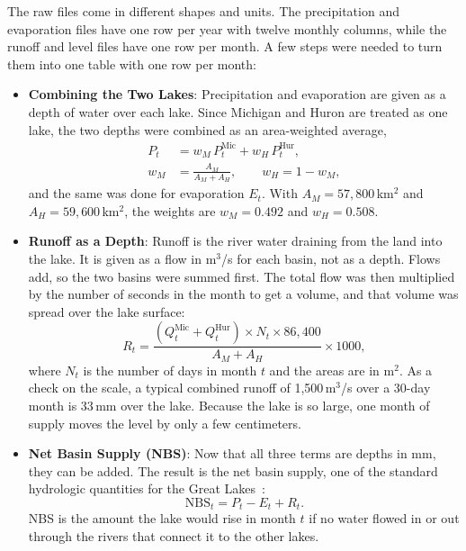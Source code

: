 \documentclass{article}
\begin{document}
The raw files come in different shapes and units. The precipitation and evaporation files have
one row per year with twelve monthly columns, while the runoff and level files have one row per
month. A few steps were needed to turn them into one table with one row per month:
\begin{itemize}
\item \textbf{Combining the Two Lakes}: Precipitation and evaporation are given as a depth of
water over each lake. Since Michigan and Huron are treated as one lake, the two depths were
combined as an area-weighted average,
\begin{align}
P_t &= w_M\,P^{\mathrm{Mic}}_t + w_H\,P^{\mathrm{Hur}}_t, \label{eq:precip}\\
w_M &= \frac{A_M}{A_M + A_H}, \qquad w_H = 1 - w_M, \label{eq:weights}
\end{align}
and the same was done for evaporation $E_t$. With $A_M = 57{,}800$\,km$^2$ and
$A_H = 59{,}600$\,km$^2$, the weights are $w_M = 0.492$ and $w_H = 0.508$.

\item \textbf{Runoff as a Depth}: Runoff is the river water draining from the land into the
lake. It is given as a flow in m$^3$/s for each basin, not as a depth. Flows add, so the two
basins were summed first. The total flow was then multiplied by the number of seconds in the
month to get a volume, and that volume was spread over the lake surface:
\begin{equation}
R_t = \frac{\left(Q^{\mathrm{Mic}}_t + Q^{\mathrm{Hur}}_t\right) \times N_t \times 86{,}400}
{A_M + A_H} \times 1000, \label{eq:runoff}
\end{equation}
where $N_t$ is the number of days in month $t$ and the areas are in m$^2$. As a check on the
scale, a typical combined runoff of 1,500\,m$^3$/s over a 30-day month is 33\,mm over the lake.
Because the lake is so large, one month of supply moves the level by only a few centimeters.

\item \textbf{Net Basin Supply (NBS)}: Now that all three terms are depths in mm, they can be
added. The result is the net basin supply, one of the standard hydrologic quantities for the
Great Lakes~\cite{glerl}:
\begin{equation}
\mathrm{NBS}_t = P_t - E_t + R_t. \label{eq:nbs}
\end{equation}
NBS is the amount the lake would rise in month $t$ if no water flowed in or out through the
rivers that connect it to the other lakes.


\end{itemize}
\end{document}
